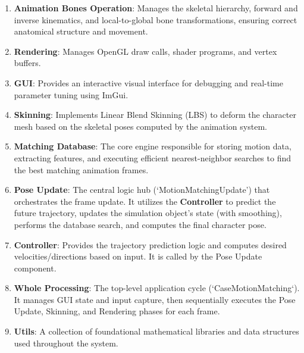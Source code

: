 \documentclass[8pt,a4paper]{extarticle}
\begin{document}
\begin{enumerate}
    \item \textbf{Animation Bones Operation}: Manages the skeletal hierarchy, forward and inverse kinematics, and local-to-global bone transformations, ensuring correct anatomical structure and movement.
    \item \textbf{Rendering}: Manages OpenGL draw calls, shader programs, and vertex buffers.
    \item \textbf{GUI}: Provides an interactive visual interface for debugging and real-time parameter tuning using ImGui.
    \item \textbf{Skinning}: Implements Linear Blend Skinning (LBS) to deform the character mesh based on the skeletal poses computed by the animation system.
    \item \textbf{Matching Database}: The core engine responsible for storing motion data, extracting features, and executing efficient nearest-neighbor searches to find the best matching animation frames.
    \item \textbf{Pose Update}: The central logic hub (`MotionMatchingUpdate') that orchestrates the frame update. It utilizes the \textbf{Controller} to predict the future trajectory, updates the simulation object's state (with smoothing), performs the database search, and computes the final character pose.
    \item \textbf{Controller}: Provides the trajectory prediction logic and computes desired velocities/directions based on input. It is called by the Pose Update component.
    \item \textbf{Whole Processing}: The top-level application cycle (`CaseMotionMatching`). It manages GUI state and input capture, then sequentially executes the Pose Update, Skinning, and Rendering phases for each frame.
    \item \textbf{Utils}: A collection of foundational mathematical libraries and data structures used throughout the system.
\end{enumerate}
\end{document}
